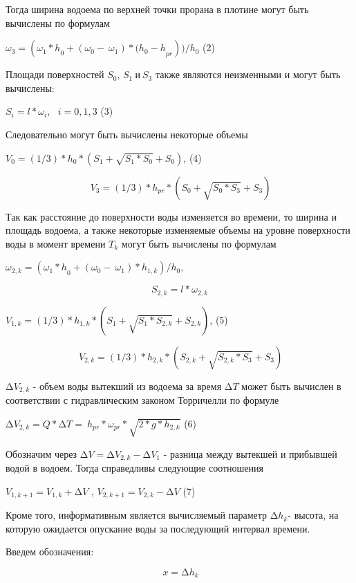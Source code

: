 \begin{multicols}{2}
Тогда ширина водоема по верхней точки прорана в плотине могут быть
вычислены по формулам

\(\omega_{3} = ({\omega_{1}*h}_{0} + \left( \omega_{0} - \ \omega_{1} \right)*{(h_{0} - h}_{pr}))/h_{0}\)
(2)

Площади поверхностей \(S_{0}\), \(S_{1}\ и\ S_{3}\) также являются
неизменными и могут быть вычислены:

\(S_{i} = l*\omega_{i},\ \ \ i = 0,1,3\) (3)

Следовательно могут быть вычислены некоторые объемы

\(V_{0} = (1/3)*h_{0}*\left( S_{1} + \sqrt{S_{1}*S_{0}} + S_{0} \right)\),
(4)

\[\ V_{3} = (1/3)*h_{pr}*\left( S_{0} + \sqrt{S_{0}*S_{3}} + S_{3} \right)\]

Так как расстояние до поверхности воды изменяется во времени, то ширина
и площадь водоема, а также некоторые изменяемые объемы на уровне
поверхности воды в момент времени \(T_{k}\) могут быть вычислены по
формулам

\(\omega_{2,k} = ({\omega_{1}*h}_{0} + \left( \omega_{0} - \ \omega_{1} \right)*h_{1,k})/h_{0}\),

\[S_{2,k} = l*\omega_{2,k}\]

\(V_{1,k} = (1/3)*h_{1,k}*\left( S_{1} + \sqrt{S_{1}*S_{2,k}} + S_{2,k} \right)\),
(5)

\[\ V_{2,k} = (1/3)*h_{2,k}*\left( S_{2,k} + \sqrt{S_{2,k}*S_{3}} + S_{3} \right)\]

\(\mathrm{\Delta}V_{2,k}\) - объем воды вытекший из водоема за время
\(\mathrm{\Delta}T\) может быть вычислен в соответствии с гидравлическим
законом Торричелли по формуле

\(\mathrm{\Delta}V_{2,k} = Q*\mathrm{\Delta}T = \ h_{pr}*\omega_{pr}*\sqrt{2*g*h_{2,k}}\)
(6)

Обозначим через
\(\mathrm{\Delta}V = \mathrm{\Delta}V_{2,k} - \mathrm{\Delta}V_{1}\) -
разница между вытекшей и прибывшей водой в водоем. Тогда справедливы
следующие соотношения

\(V_{1,k + 1} = V_{1,k} + \mathrm{\Delta}V\) ,
\(V_{2,k + 1} = V_{2,k} - \mathrm{\Delta}V\) (7)

Кроме того, информативным является вычисляемый параметр
\({\mathrm{\Delta}h}_{k}\)- высота, на которую ожидается опускание воды
за последующий интервал времени.

Введем обозначения:

\[\ {x = \mathrm{\Delta}h}_{k}\]


\end{multicols}
